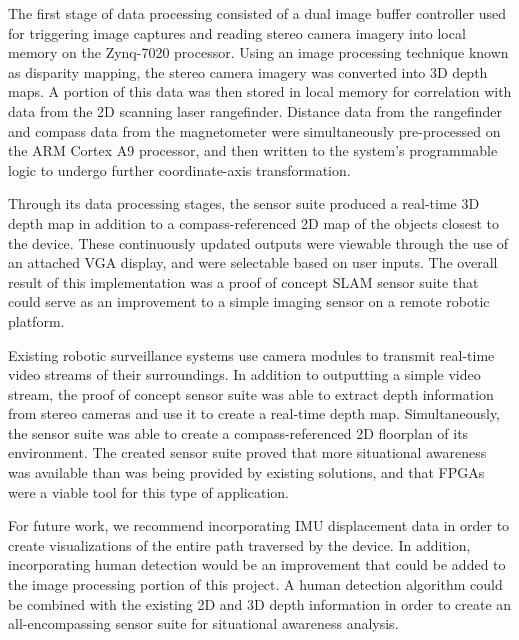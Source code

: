 \par
The first stage of data processing consisted of a dual image buffer controller used for triggering image captures and reading stereo camera imagery into local memory on the Zynq-7020 processor. Using an image processing technique known as disparity mapping, the stereo camera imagery was converted into 3D depth maps. A portion of this data was then stored in local memory for correlation with data from the 2D scanning laser rangefinder. Distance data from the rangefinder and compass data from the magnetometer were simultaneously pre-processed on the ARM Cortex A9 processor, and then written to the system's programmable logic to undergo further coordinate-axis transformation. 
\par
Through its data processing stages, the sensor suite produced a real-time 3D depth map in addition to a compass-referenced 2D map of the objects closest to the device. These continuously updated outputs were viewable through the use of an attached VGA display, and were selectable based on user inputs. The overall result of this implementation was a proof of concept SLAM sensor suite that could serve as an improvement to a simple imaging sensor on a remote robotic platform.
\par
Existing robotic surveillance systems use camera modules to transmit real-time video streams of their surroundings. In addition to outputting a simple video stream, the proof of concept sensor suite was able to extract depth information from stereo cameras and use it to create a real-time depth map. Simultaneously, the sensor suite was able to create a compass-referenced 2D floorplan of its environment. The created sensor suite proved that more situational awareness was available than was being provided by existing solutions, and that FPGAs were a viable tool for this type of application. 
\par
For future work, we recommend incorporating IMU displacement data in order to create visualizations of the entire path traversed by the device. In addition, incorporating human detection would be an improvement that could be added to the image processing portion of this project. A human detection algorithm could be combined with the existing 2D and 3D depth information in order to create an all-encompassing sensor suite for situational awareness analysis. 





